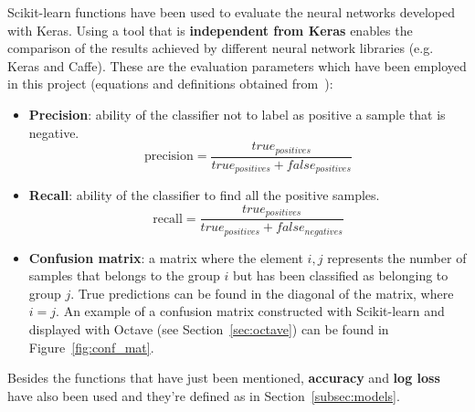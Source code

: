 Scikit-learn functions have been used to evaluate the neural networks developed with Keras. Using a tool that is \textbf{independent from Keras} enables the comparison of the results achieved by different neural network libraries (e.g. Keras and Caffe). These are the evaluation parameters which have been employed in this project (equations and definitions obtained from~\cite{scikit-doc}):
\begin{itemize}
	\item \textbf{Precision}: ability of the classifier not to label as positive a sample that is negative.
	\begin{equation}\label{eq:precision}
	\textrm{precision}=\frac{true_{positives}}{true_{positives}+false_{positives}}
	\end{equation}
	
	\item \textbf{Recall}: ability of the classifier to find all the positive samples.
	\begin{equation}\label{eq:recall}
	\textrm{recall}=\frac{true_{positives}}{true_{positives}+false_{negatives}}
	\end{equation}
	
	\item \textbf{Confusion matrix}: a matrix where the element $i,j$ represents the number of samples that belongs to the group $i$ but has been classified as belonging to group $j$. True predictions can be found in the diagonal of the matrix, where $i=j$. An example of a confusion matrix constructed with Scikit-learn and displayed with Octave (see Section~\ref{sec:octave}) can be found in Figure~\ref{fig:conf_mat}.
\end{itemize}

Besides the functions that have just been mentioned, \textbf{accuracy} and \textbf{log loss} have also been used and they're defined as in Section~\ref{subsec:models}.

